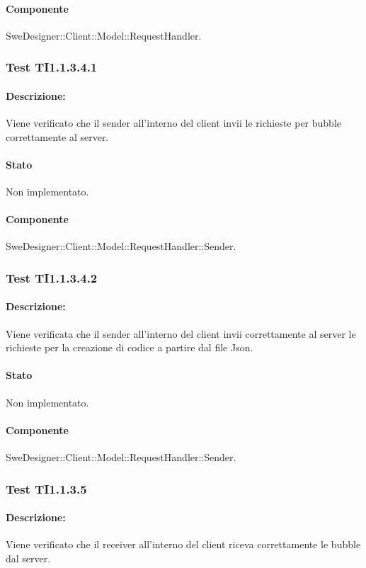 \documentclass[../PianoDiQualifica.tex]{subfiles}
\begin{document}
	\paragraph{Componente} SweDesigner::Client::Model::RequestHandler.
	\subsubsection{Test TI1.1.3.4.1}
	\paragraph{Descrizione:} Viene verificato che il sender all'interno del client invii le richieste per bubble correttamente al server.
	\paragraph{Stato} Non implementato.
	\paragraph{Componente} SweDesigner::Client::Model::RequestHandler::Sender.
	
	\subsubsection{Test TI1.1.3.4.2}
	\paragraph{Descrizione:} Viene verificata che il sender all'interno del client invii  correttamente al server le richieste per la creazione di codice a partire dal file Json.
	\paragraph{Stato} Non implementato.
	\paragraph{Componente} SweDesigner::Client::Model::RequestHandler::Sender.
	
	\subsubsection{Test TI1.1.3.5}
	\paragraph{Descrizione:} Viene verificato che il receiver all'interno del client riceva correttamente le bubble dal server.
\end{document}
